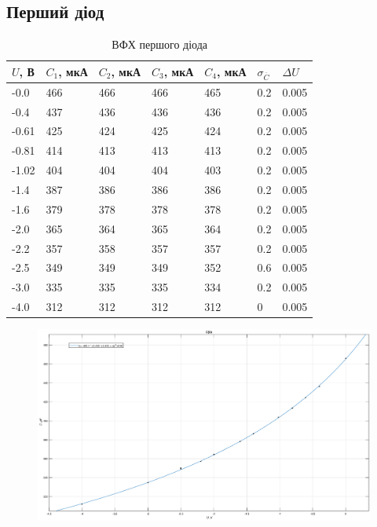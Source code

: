 \documentclass[12pt]{article}
\begin{document}
\subsection{Перший діод}
\begin{table}[!ht]
	\centering
	\caption{ВФХ першого діода}
	\begin{tabular}{lllllll}
		\hline
        $U$, В & $C_1$, мкА & $C_2$, мкА & $C_3$, мкА & $C_4$, мкА & $\sigma_{\overline{C}}$ & $\Delta U$ \\
		\hline
        -0.0  & 466 & 466 & 466 & 465 & 0.2 & 0.005\\
		-0.4  & 437 & 436 & 436 & 436 & 0.2 & 0.005\\
		-0.61 & 425 & 424 & 425 & 424 & 0.2 & 0.005\\
		-0.81 & 414 & 413 & 413 & 413 & 0.2 & 0.005\\
		-1.02 & 404 & 404 & 404 & 403 & 0.2 & 0.005\\
		-1.4  & 387 & 386 & 386 & 386 & 0.2 & 0.005\\
		-1.6  & 379 & 378 & 378 & 378 & 0.2 & 0.005\\
		-2.0  & 365 & 364 & 365 & 364 & 0.2 & 0.005\\
		-2.2  & 357 & 358 & 357 & 357 & 0.2 & 0.005\\
		-2.5  & 349 & 349 & 349 & 352 & 0.6 & 0.005\\
		-3.0  & 335 & 335 & 335 & 334 & 0.2 & 0.005\\
		-4.0  & 312 & 312 & 312 & 312 & 0 & 0.005\\
		\hline
	\end{tabular}
\end{table}
\begin{figure}[!ht]
    \centering
    \includegraphics[scale=0.25]{vfc_0.eps}
\end{figure}
\end{document}
